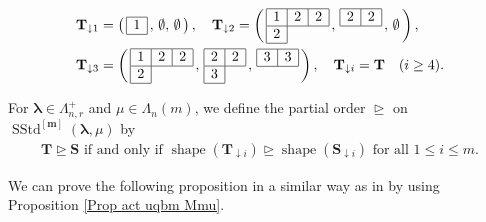 \documentclass[12pt]{amsart}
\numberwithin{equation}{thm}
\newcommand\bS{\mathbf S}
\newcommand\bT{\mathbf T}
\renewcommand\bm{\mathbf m} %
\newcommand\vL{\varLambda}
\newcommand\Bla{\boldsymbol\lambda}
\newcommand{\da}{\downarrow}
\newcommand\trreq{\trianglerighteq}
\newcommand{\SStd}{\operatorname{SStd}}
\newcommand{\shape}{\operatorname{shape}}
\begin{document}
\begin{align*}
&\bT_{\da 1}= \left( \, \begin{array}{|c|c|c|} \hline 1 \\ \hline  \end{array} \, , 
	\, 
	\emptyset, 
	\, 
	\emptyset 
	\, 
	\right), 
\quad 
\bT_{\da 2}= \left( \, \begin{array}{|c|c|c|} \hline 1 & 2 & 2 \\ \hline 2  \\ \cline{1-1}  \end{array} \, , 
	\, 
	\begin{array}{|c|c|c|} \hline 2 & 2 \\ \hline \multicolumn{1}{c}{}   \end{array} \, , 
	\, 
	\emptyset 
	\, 
	\right), 
\\
&\bT_{\da 3}= \left( \, \begin{array}{|c|c|c|} \hline 1 & 2 & 2 \\ \hline 2  \\ \cline{1-1}  \end{array} \, , 
	\, 
	\begin{array}{|c|c|c|} \hline 2 & 2 \\ \hline 3  \\ \cline{1-1}  \end{array} \, , 
	\, 
	\begin{array}{|c|c|c|c|} \hline 3 & 3 \\ \cline{1-2} \multicolumn{1}{c}{} \end{array} 
	\, 
	\right), 
\quad 
\bT_{\da i} = \bT \quad (i \geq 4).
\end{align*}

For $\Bla \in \vL^+_{n,r}$ and $\mu \in \vL_n(m)$, 
we define the partial order $\trreq$ on $\SStd^{[\bm]} (\Bla, \mu)$ by 
\begin{align*} 
\bT \trreq \bS  \text{ if and only if } \shape ( \bT_{\da i}) \trreq \shape (\bS_{\da i}) \text{ for all } 1 \leq i \leq m.
\end{align*}

We can prove the following proposition in a similar way as in \cite[proof of Theorem 3.10]{JM00} 
by using Proposition \ref{Prop act uqbm Mmu}. 

\end{document}
